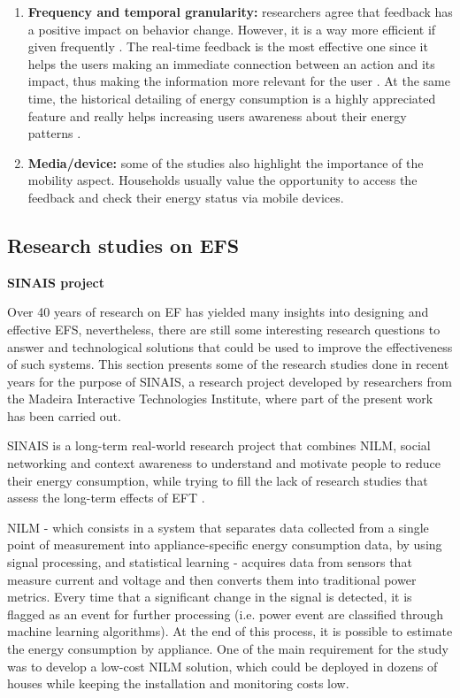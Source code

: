 \begin{enumerate}
\item \textbf{Frequency and temporal granularity:}
researchers agree that feedback has a positive impact on behavior change. However, it is a way more efficient if given frequently \cite{Feedbackonhouseholdelectricityconsumption:atoolforsavingenergy?}. The real-time feedback is the most effective one \cite{Froehlich2010} since it helps the users making an immediate connection between an action and its impact, thus making the information more relevant for the user \cite{Fitzpatrick2009}. At the same time, the historical detailing of energy consumption is a highly appreciated feature \cite{Giulio2009, Petkov2011} and really helps increasing users awareness about their energy patterns \cite{Fitzpatrick2009}.

\item \textbf{Media/device:}
some of the studies \cite{Fitzpatrick2009, Froehlich2010, Pereira2013} also highlight the importance of the mobility aspect. Households usually value the opportunity to access the feedback and check their energy status via mobile devices.

\end{enumerate}

\subsection{Research studies on EFS}

\textbf{\ac{SINAIS} project}


Over 40 years of research on \ac{EF} has yielded many insights into designing and effective \ac{EFS}, nevertheless, there are still some interesting research questions to answer and technological solutions that could be used to improve the effectiveness of such systems. This section presents some of the research studies done in recent years for the purpose of \ac{SINAIS}, a research project developed by researchers from the Madeira Interactive Technologies Institute, where part of the present work has been carried out.


\ac{SINAIS} is a long-term real-world research project that combines \ac{NILM}, social networking and context awareness to understand and motivate people to reduce their energy consumption, while trying to fill the lack of research studies that assess the long-term effects of \ac{EFT} \cite{Pereira2012}.


\ac{NILM} - which consists in a system that separates data collected from a single point of measurement into appliance-specific energy consumption data, by using signal processing, and statistical learning - acquires data from sensors that measure current and voltage and then converts them into traditional power metrics. Every time that a significant change in the signal is detected, it is flagged as an event for further processing (i.e. power event are classified through machine learning algorithms). At the end of this process, it is possible to estimate the energy consumption by appliance. One of the main requirement for the study was to develop a low-cost \ac{NILM} solution, which could be deployed in dozens of houses while keeping the installation and monitoring costs low.


